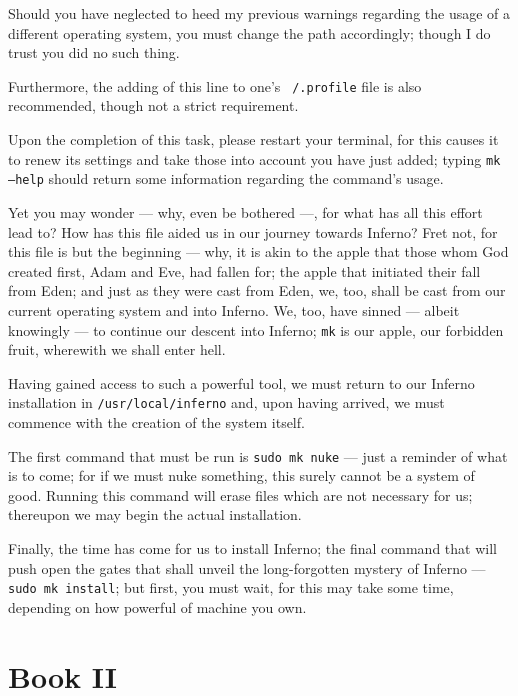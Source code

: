 \documentclass[a5paper,twoside,12pt]{report}
\begin{document}
Should you have neglected to heed my previous warnings regarding the usage of a different operating system, you must change the path accordingly; though I do trust you did no such thing.

Furthermore, the adding of this line to one's \texttt{~/.profile} file is also recommended, though not a strict requirement.

Upon the completion of this task, please restart your terminal, for this causes it to renew its settings and take those into account you have just added; typing \texttt{mk --help} should return some information regarding the command's usage.

Yet you may wonder — why, even be bothered —, for what has all this effort lead to? How has this file aided us in our journey towards Inferno? Fret not, for this file is but the beginning — why, it is akin to the apple that those whom God created first, Adam and Eve, had fallen for; the apple that initiated their fall from Eden; and just as they were cast from Eden, we, too, shall be cast from our current operating system and into Inferno. We, too, have sinned — albeit knowingly — to continue our descent into Inferno; \texttt{mk} is our apple, our forbidden fruit, wherewith we shall enter hell.

Having gained access to such a powerful tool, we must return to our Inferno installation in \texttt{/usr/local/inferno} and, upon having arrived, we must commence with the creation of the system itself.

The first command that must be run is \texttt{sudo mk nuke} — just a reminder of what is to come; for if we must nuke something, this surely cannot be a system of good. Running this command will erase files which are not necessary for us; thereupon we may begin the actual installation.

Finally, the time has come for us to install Inferno; the final command that will push open the gates that shall unveil the long-forgotten mystery of Inferno — \texttt{sudo mk install}; but first, you must wait, for this may take some time, depending on how powerful of machine you own.

\newpage

\part*{Book II}
  \thispagestyle{empty}
  \newpage

\thispagestyle{empty}
  \mbox{}
  \newpage
\end{document}
